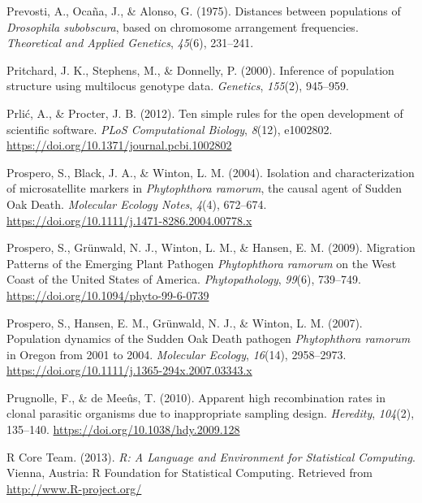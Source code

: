 \documentclass[double,11pt]{beavtex}
\begin{document}
  \hypertarget{ref-prevosti1975distances}{}
  Prevosti, A., Ocaña, J., \& Alonso, G. (1975). Distances between
  populations of \emph{Drosophila subobscura}, based on chromosome
  arrangement frequencies. \emph{Theoretical and Applied Genetics},
  \emph{45}(6), 231--241.
  
  \hypertarget{ref-pritchard2000inference}{}
  Pritchard, J. K., Stephens, M., \& Donnelly, P. (2000). Inference of
  population structure using multilocus genotype data. \emph{Genetics},
  \emph{155}(2), 945--959.
  
  \hypertarget{ref-prliac2012software}{}
  Prlić, A., \& Procter, J. B. (2012). Ten simple rules for the open
  development of scientific software. \emph{PLoS Computational Biology},
  \emph{8}(12), e1002802.
  \url{https://doi.org/10.1371/journal.pcbi.1002802}
  
  \hypertarget{ref-prospero2004isolation}{}
  Prospero, S., Black, J. A., \& Winton, L. M. (2004). Isolation and
  characterization of microsatellite markers in \emph{Phytophthora
  ramorum}, the causal agent of Sudden Oak Death. \emph{Molecular Ecology
  Notes}, \emph{4}(4), 672--674.
  \url{https://doi.org/10.1111/j.1471-8286.2004.00778.x}
  
  \hypertarget{ref-prospero2009migration}{}
  Prospero, S., Grünwald, N. J., Winton, L. M., \& Hansen, E. M. (2009).
  Migration Patterns of the Emerging Plant Pathogen \emph{Phytophthora
  ramorum} on the West Coast of the United States of America.
  \emph{Phytopathology}, \emph{99}(6), 739--749.
  \url{https://doi.org/10.1094/phyto-99-6-0739}
  
  \hypertarget{ref-prospero2007population}{}
  Prospero, S., Hansen, E. M., Grünwald, N. J., \& Winton, L. M. (2007).
  Population dynamics of the Sudden Oak Death pathogen \emph{Phytophthora
  ramorum} in Oregon from 2001 to 2004. \emph{Molecular Ecology},
  \emph{16}(14), 2958--2973.
  \url{https://doi.org/10.1111/j.1365-294x.2007.03343.x}
  
  \hypertarget{ref-prugnolle2010apparent}{}
  Prugnolle, F., \& de Meeûs, T. (2010). Apparent high recombination rates
  in clonal parasitic organisms due to inappropriate sampling design.
  \emph{Heredity}, \emph{104}(2), 135--140.
  \url{https://doi.org/10.1038/hdy.2009.128}
  
  \hypertarget{ref-R2013}{}
  R Core Team. (2013). \emph{R: A Language and Environment for Statistical
  Computing}. Vienna, Austria: R Foundation for Statistical Computing.
  Retrieved from \url{http://www.R-project.org/}
  
\end{document}
